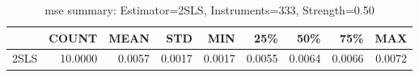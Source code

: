 \begin{table}[ht]
\centering
\caption{mse summary: Estimator=2SLS, Instruments=333, Strength=0.50}
\begin{tabular}{lrrrrrrrr}
\toprule
 & COUNT & MEAN & STD & MIN & 25\% & 50\% & 75\% & MAX \\
\midrule
2SLS & 10.0000 & 0.0057 & 0.0017 & 0.0017 & 0.0055 & 0.0064 & 0.0066 & 0.0072 \\
\bottomrule
\end{tabular}
\end{table}
